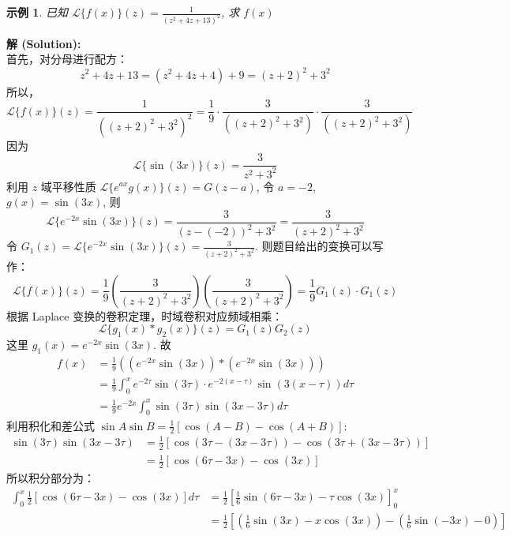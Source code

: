 \documentclass[linespread=1.5,openany]{book}%
\def\diff{d}%
\theoremstyle{plain}
\newtheorem{example}[theorem]{示例}
\newcommand{\diff}{\mathop{}\!\mathrm{d}}  %
\begin{document}
{{{{						%
						\begin{example}已知 $\mathcal{L}\{f(x)\}(z) = \frac{1}{(z^2+4z+13)^2}$, 求 $f(x)$ \label{ex:L15_ch_app_inv_laplace1}
						\end{example}
						
						\noindent\textbf{解 (Solution):} \\
						首先，对分母进行配方：
						\[ z^2+4z+13 = (z^2+4z+4) + 9 = (z+2)^2 + 3^2 \]
						所以，
						\[ \mathcal{L}\{f(x)\}(z) = \frac{1}{((z+2)^2+3^2)^2} = \frac{1}{9} \cdot \frac{3}{((z+2)^2+3^2)} \cdot \frac{3}{((z+2)^2+3^2)}\]
						因为
						\[ \mathcal{L}\{\sin(3x)\}(z) = \frac{3}{z^2+3^2} \]
						利用 $z$ 域平移性质 $\mathcal{L}\{e^{ax}g(x)\}(z) = G(z-a)$, 令 $a=-2$, $g(x)=\sin(3x)$, 则
						\[ \mathcal{L}\{e^{-2x}\sin(3x)\}(z) = \frac{3}{(z-(-2))^2+3^2} = \frac{3}{(z+2)^2+3^2} \]
						令 $G_1(z) = \mathcal{L}\{e^{-2x}\sin(3x)\}(z) = \frac{3}{(z+2)^2+3^2}$.
						则题目给出的变换可以写作：
						\[ \mathcal{L}\{f(x)\}(z) = \frac{1}{9} \left( \frac{3}{(z+2)^2+3^2} \right) \left( \frac{3}{(z+2)^2+3^2} \right) = \frac{1}{9} G_1(z) \cdot G_1(z) \]
						根据 Laplace 变换的卷积定理，时域卷积对应频域相乘：
						\[ \mathcal{L}\{g_1(x) * g_2(x)\}(z) = G_1(z)G_2(z) \]
						这里 $g_1(x) = e^{-2x}\sin(3x)$.
						故
						\begin{align*}
							f(x) &= \frac{1}{9} \left( (e^{-2x}\sin(3x)) * (e^{-2x}\sin(3x)) \right) \\
							&= \frac{1}{9} \int_{0}^{x} e^{-2\tau}\sin(3\tau) \cdot e^{-2(x-\tau)}\sin(3(x-\tau)) \diff \tau \\
							&= \frac{1}{9} e^{-2x} \int_{0}^{x} \sin(3\tau)\sin(3x-3\tau) \diff \tau
						\end{align*}
						利用积化和差公式 $\sin A \sin B = \frac{1}{2}[\cos(A-B) - \cos(A+B)]$:
						\begin{align*}
							\sin(3\tau)\sin(3x-3\tau) &= \frac{1}{2}[\cos(3\tau - (3x-3\tau)) - \cos(3\tau + (3x-3\tau))] \\
							&= \frac{1}{2}[\cos(6\tau - 3x) - \cos(3x)]
						\end{align*}
						所以积分部分为：
						\begin{align*}
							\int_{0}^{x} \frac{1}{2}[\cos(6\tau - 3x) - \cos(3x)] \diff \tau &= \frac{1}{2} \left[ \frac{1}{6}\sin(6\tau - 3x) - \tau\cos(3x) \right]_{0}^{x} \\
							&= \frac{1}{2} \left[ \left(\frac{1}{6}\sin(3x) - x\cos(3x)\right) - \left(\frac{1}{6}\sin(-3x) - 0\right) \right] \\

\end{align*}}}}}
\end{document}
